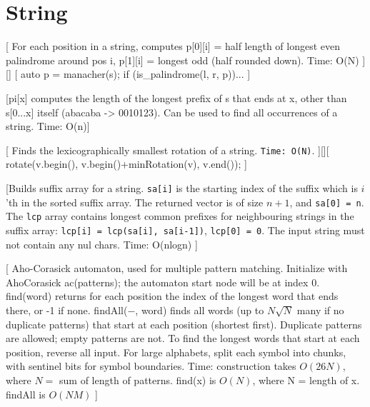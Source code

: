 \chapter{String}



[
    For each position in a string, computes p[0][i] = half length of longest even 
    palindrome around pos i, p[1][i] = longest odd (half rounded down). Time: O(N)
]
[]
[
    auto p = manacher(s);
    if (is_palindrome(l, r, p))...
]

[pi[x] computes the length of the longest prefix of s that ends at x, other than s[0...x] itself (abacaba -> 0010123).
 Can be used to find all occurrences of a string. Time: O(n)]


[
    Finds the lexicographically smallest rotation of a string. \texttt{Time: O(N)}.
][][ rotate(v.begin(), v.begin()+minRotation(v), v.end()); ]

[Builds suffix array for a string. \texttt{sa[i]} is the starting index of the suffix which
 is $i$'th in the sorted suffix array. The returned vector is of size $n+1$, and \texttt{sa[0] = n}.
 The \texttt{lcp} array contains longest common prefixes for neighbouring strings in the suffix array:
 \texttt{lcp[i] = lcp(sa[i], sa[i-1])}, \texttt{lcp[0] = 0}. The input string must not contain any nul chars.
 Time: O(nlogn)
 ]


[
    Aho-Corasick automaton, used for multiple pattern matching. Initialize with 
    AhoCorasick ac(patterns); the automaton start node will be at index 0. find(word) returns 
    for each position the index of the longest word that ends there, or -1 if none. findAll($-$, word) 
    finds all words (up to $N \sqrt N$ many if no duplicate patterns) that start at each position 
    (shortest first). Duplicate patterns are allowed; empty patterns are not. To find the longest 
    words that start at each position, reverse all input. For large alphabets, split each symbol into 
    chunks, with sentinel bits for symbol boundaries. Time: construction takes $O(26N)$, 
    where $N =$ sum of length of patterns. find(x) is $O(N)$, where N = length of x. findAll is $O(NM)$
]


